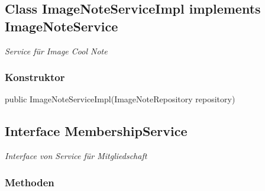 \documentclass[a4paper]{scrreprt}
\begin{document}
        \subsection{Class ImageNoteServiceImpl implements ImageNoteService}
        \textit{Service für Image Cool Note}
        \subsubsection{Konstruktor}
        public ImageNoteServiceImpl(ImageNoteRepository repository)
        \subsection{Interface MembershipService}
        \textit{Interface von Service für Mitgliedschaft}
        \subsubsection{Methoden}
\end{document}
